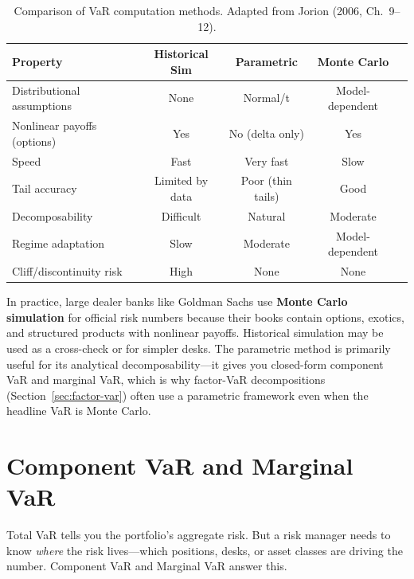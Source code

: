 \begin{table}[h]
\centering
\small
\begin{tabular}{@{}lcccc@{}}
\toprule
\textbf{Property} & \textbf{Historical Sim} & \textbf{Parametric}
  & \textbf{Monte Carlo} \\
\midrule
Distributional assumptions & None & Normal/t & Model-dependent \\
Nonlinear payoffs (options) & Yes & No (delta only) & Yes \\
Speed & Fast & Very fast & Slow \\
Tail accuracy & Limited by data & Poor (thin tails) & Good \\
Decomposability & Difficult & Natural & Moderate \\
Regime adaptation & Slow & Moderate & Model-dependent \\
Cliff/discontinuity risk & High & None & None \\
\bottomrule
\end{tabular}
\caption{Comparison of VaR computation methods.  Adapted from
Jorion (2006, Ch.~9--12).}
\label{tab:var-methods}
\end{table}

\begin{keyidea}
In practice, large dealer banks like Goldman Sachs use \textbf{Monte Carlo
simulation} for official risk numbers because their books contain
options, exotics, and structured products with nonlinear payoffs.
Historical simulation may be used as a cross-check or for simpler desks.
The parametric method is primarily useful for its analytical
decomposability---it gives you closed-form component VaR and marginal
VaR, which is why factor-VaR decompositions (Section~\ref{sec:factor-var})
often use a parametric framework even when the headline VaR is Monte Carlo.
\end{keyidea}


\section{Component VaR and Marginal VaR}
\label{sec:component-var}

Total VaR tells you the portfolio's aggregate risk.  But a risk manager
needs to know \emph{where} the risk lives---which positions, desks, or
asset classes are driving the number.  Component VaR and Marginal VaR
answer this.

